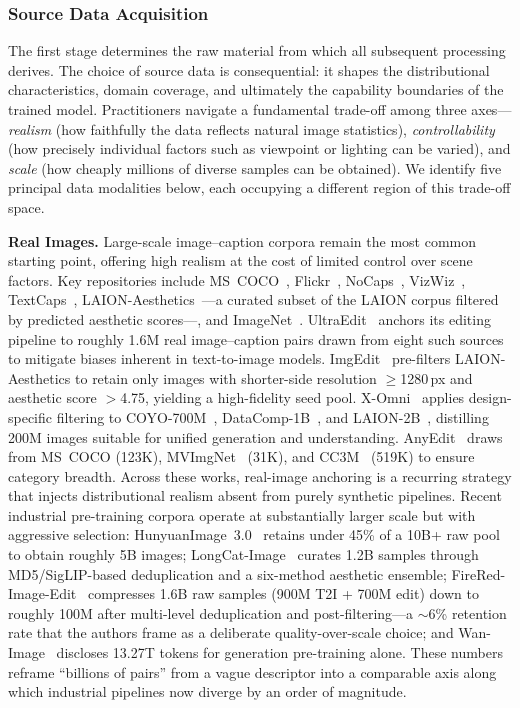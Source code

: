 \documentclass{llmxive}
\begin{document}
\subsubsection{Source Data Acquisition}\label{sec:source}

The first stage determines the raw material from which all subsequent processing derives. The choice of source data is consequential: it shapes the distributional characteristics, domain coverage, and ultimately the capability boundaries of the trained model. Practitioners navigate a fundamental trade-off among three axes---\emph{realism} (how faithfully the data reflects natural image statistics), \emph{controllability} (how precisely individual factors such as viewpoint or lighting can be varied), and \emph{scale} (how cheaply millions of diverse samples can be obtained). We identify five principal data modalities below, each occupying a different region of this trade-off space.

\textbf{Real Images.}
Large-scale image--caption corpora remain the most common starting point, offering high realism at the cost of limited control over scene factors. Key repositories include MS~COCO~\citep{lin2014microsoft}, Flickr~\citep{young2014image}, NoCaps~\citep{agrawal2019nocaps}, VizWiz~\citep{gurari2018vizwiz}, TextCaps~\citep{sidorov2020textcaps}, LAION-Aesthetics~\citep{schuhmann2022laion}---a curated subset of the LAION corpus filtered by predicted aesthetic scores---, and ImageNet~\citep{deng2009imagenet}. UltraEdit~\citep{zhao2024ultraedit} anchors its editing pipeline to roughly 1.6M real image--caption pairs drawn from eight such sources to mitigate biases inherent in text-to-image models. ImgEdit~\citep{ye2025imgedit} pre-filters LAION-Aesthetics to retain only images with shorter-side resolution $\geq$1280\,px and aesthetic score $>$4.75, yielding a high-fidelity seed pool. X-Omni~\citep{geng2025x} applies design-specific filtering to COYO-700M~\citep{kakaobrain2022coyo-700m}, DataComp-1B~\citep{gadre2023datacomp}, and LAION-2B~\citep{schuhmann2022laion}, distilling 200M images suitable for unified generation and understanding. AnyEdit~\citep{yu2025anyedit} draws from MS~COCO (123K), MVImgNet~\citep{yu2023mvimgnet} (31K), and CC3M~\citep{sharma2018conceptual} (519K) to ensure category breadth. Across these works, real-image anchoring is a recurring strategy that injects distributional realism absent from purely synthetic pipelines. Recent industrial pre-training corpora operate at substantially larger scale but with aggressive selection: HunyuanImage~3.0~\citep{cao2025hunyuanimage} retains under 45\% of a 10B+ raw pool to obtain roughly 5B images; LongCat-Image~\citep{team2025longcat} curates 1.2B samples through MD5/SigLIP-based deduplication and a six-method aesthetic ensemble; FireRed-Image-Edit~\citep{team2026firered} compresses 1.6B raw samples (900M T2I + 700M edit) down to roughly 100M after multi-level deduplication and post-filtering---a $\sim$6\% retention rate that the authors frame as a deliberate quality-over-scale choice; and Wan-Image~\citep{mao2026wan} discloses 13.27T tokens for generation pre-training alone. These numbers reframe ``billions of pairs'' from a vague descriptor into a comparable axis along which industrial pipelines now diverge by an order of magnitude.
\end{document}
